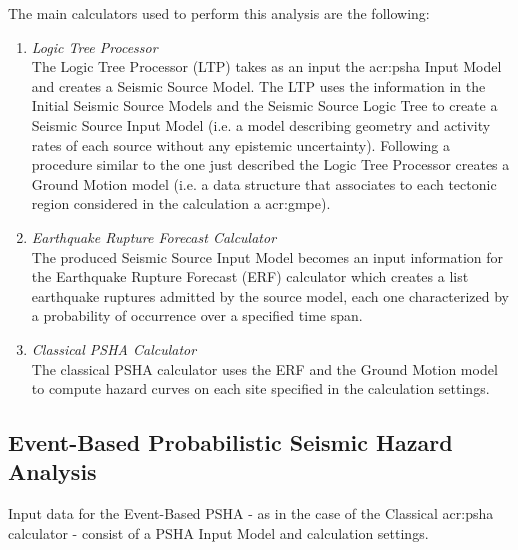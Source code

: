 The main calculators used to perform this analysis are the following:
\begin{enumerate}
\item \emph{Logic Tree Processor} \hfill \\
The Logic Tree Processor (LTP) takes as an input the \gls{acr:psha} 
Input Model and creates a Seismic Source Model. The LTP uses the 
information in the Initial Seismic Source Models and  
the Seismic Source Logic Tree to create a Seismic Source Input
Model (i.e. a model describing geometry and activity rates of each 
source without any epistemic uncertainty). 
%
Following a procedure similar to the one just described the Logic Tree 
Processor creates a Ground Motion model (i.e. a data structure that 
associates to each tectonic region considered in the calculation a 
\gls{acr:gmpe}).
%
\item \emph{Earthquake Rupture Forecast Calculator} \hfill \\
The produced Seismic Source Input Model becomes an input information for 
the Earthquake Rupture Forecast (ERF) calculator which creates a list 
earthquake ruptures admitted by the source model, each one characterized
by a probability of occurrence over a specified time span.
\item \emph{Classical PSHA Calculator} \hfill \\
The classical PSHA calculator uses the ERF and the Ground Motion model 
to compute hazard curves on each site specified in the calculation settings.
\end{enumerate} 
%
\subsection{Event-Based Probabilistic Seismic Hazard Analysis}
\label{section:event-basedPSHA}
Input data for the Event-Based PSHA - as in the case of the 
Classical \gls{acr:psha} calculator - consist of a PSHA Input Model 
and calculation settings.

